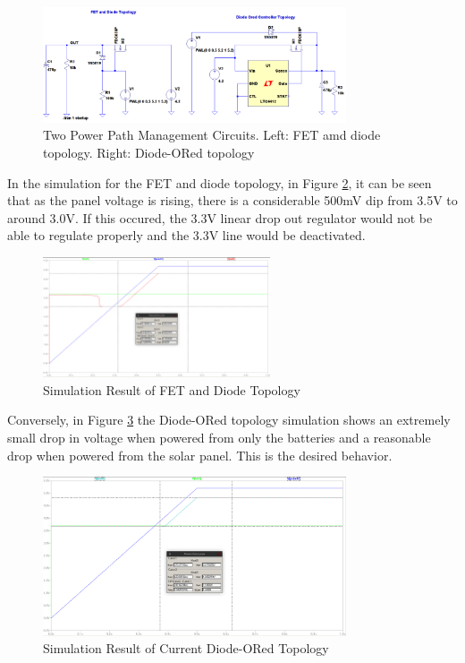 \documentclass{article}
\numberwithin{figure}{section}
\numberwithin{equation}{section}
\begin{document}
{\begin{figure}[H]
	\centering
	\includegraphics[width=0.8\textwidth]{DiodeORSIM}
	\caption{Two Power Path Management Circuits. Left: FET amd diode topology. Right: Diode-ORed topology}
	\label{fig:doredsim}
\end{figure}

In the simulation for the FET and diode topology, in Figure \ref{fig:doredsimres1}, it can be seen that as the panel voltage is rising, there is a considerable 500mV dip from 3.5V to around 3.0V. If this occured, the 3.3V linear drop out regulator would not be able to regulate properly and the 3.3V line would be deactivated.
\begin{figure}[H]
	\centering
	\includegraphics[width=0.6\textwidth]{DiodeORres1}
	\caption{Simulation Result of FET and Diode Topology}
	\label{fig:doredsimres1}
\end{figure}

Conversely, in Figure \ref{fig:doredsimres2} the Diode-ORed topology simulation shows an extremely small drop in voltage when powered from only the batteries and a reasonable drop when powered from the solar panel. This is the desired behavior.
\begin{figure}[H]
	\centering
	\includegraphics[width=0.8\textwidth]{DiodeORres2}
	\caption{Simulation Result of Current Diode-ORed Topology}
	\label{fig:doredsimres2}
\end{figure}

}
\end{document}
